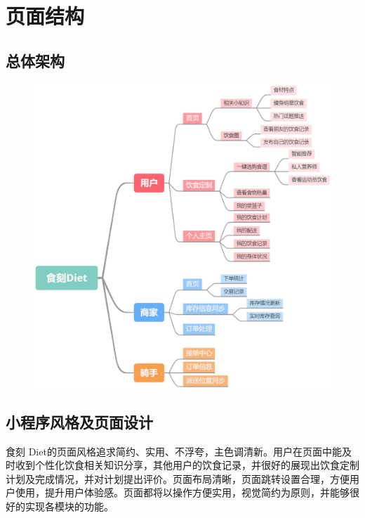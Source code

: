 \documentclass[UTF8,12pt]{ctexart}
\numberwithin{figure}{section}%
\begin{document}
\begin{spacing}{2}
\begin{enumerate}
\end{enumerate}


\newpage

\section{页面结构}

\subsection{总体架构}


\begin{figure}[H]
	\centering
	\includegraphics[width=14cm]{fig/Diet}
\end{figure}	

\newpage

\subsection{小程序风格及页面设计}
食刻 Diet的页面风格追求简约、实用、不浮夸，主色调清新。用户在页面中能及时收到个性化饮食相关知识分享，其他用户的饮食记录，并很好的展现出饮食定制计划及完成情况，并对计划提出评价。页面布局清晰，页面跳转设置合理，方便用户使用，提升用户体验感。页面都将以操作方便实用，视觉简约为原则，并能够很好的实现各模块的功能。


\end{spacing}
\end{document}
